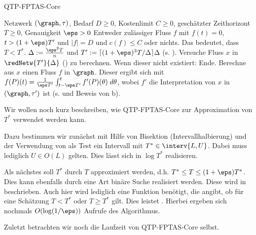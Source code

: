 \begin{algorithm}[H]
\caption{QTP-FPTAS-Core}
\label{alg:qtp_core}
\begin{algorithmic}[1]
    \REQUIRE Netzwerk $(\graph, \tau)$, Bedarf $D \geq 0$, Kostenlimit $C \geq 0$,
        geschätzter Zeithorizont $T \geq 0$, Genauigkeit $\eps > 0$
    \ENSURE Entweder zulässiger Fluss $f$ mit $f(t) = 0$, $t > (1+\eps) T'$
        und $|f| = D$ und $c(f) \leq C$ oder nichts. Das bedeutet, dass
        $T < T^*$.
    \STATE $\Delta := \frac{\eps^2 T}{n}$ und
        $T' := \lceil (1+\eps)^3 T / \Delta \rceil \Delta$ (s. ).
    \STATE Versuche Fluss $x$ in $\redNetw{T'}{\Delta}$ ()
        zu berechnen. Wenn dieser nicht existiert: Ende.
    \STATE Berechne aus $x$ einen Fluss $f$ in $\graph$. Dieser ergibt sich mit
        $f(P)(t) = \frac{1}{\eps T'}
                            \int_{t - \eps T'}^{t} f'(P)(\theta) \; d\theta$,
        wobei $f'$ die Interpretation von $x$ in $(\graph, \tau')$ ist
        (s.  und Beweis von b).
\end{algorithmic}
\end{algorithm}

Wir wollen noch kurz beschreiben, wie QTP-FPTAS-Core zur Approximation von
$T^*$ verwendet werden kann.

Dazu bestimmen wir zunächst mit Hilfe von Bisektion (Intervallhalbierung)
und der Verwendung von  als Test ein Intervall mit
$T^* \in \interv{L,U}$. Dabei muss lediglich $U \in O(L)$ gelten.
Dies lässt sich in $\log T^*$ realisieren.

Als nächstes soll $T^*$ durch $T$ approximiert werden,
d.h. $T^* \leq T \leq (1+\eps) T^*$. Dies kann ebenfalls durch eine Art binäre Suche
realisiert werden. Diese wird in \cite[Abschnitt 4]{Hassin} beschrieben. Auch hier
wird lediglich eine Funktion benötigt, die angibt, ob für eine Schätzung
$T < T^*$ oder $T \geq T^*$ gilt. Dies leistet .
Hierbei ergeben sich nochmals $O(\log(1/\eps))$ Aufrufe des Algorithmus.

Zuletzt betrachten wir noch die Laufzeit von QTP-FPTAS-Core selbst.

